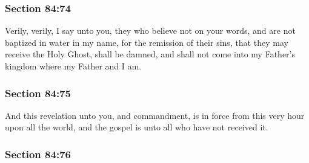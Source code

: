 
	\subsubsection{Section 84:74} %
		\label{DC84-74}

		Verily, verily, I say unto you, they who believe not on your words, and are not baptized in water in my name, for the remission of their sins, that they may receive the Holy Ghost, shall be damned, and shall not come into my Father's kingdom where my Father and I am.


	\subsubsection{Section 84:75} %
		\label{DC84-75}

		And this revelation unto you, and commandment, is in force from this very hour upon all the world, and the gospel is unto all who have not received it.


	\subsubsection{Section 84:76} %
		\label{DC84-76}

